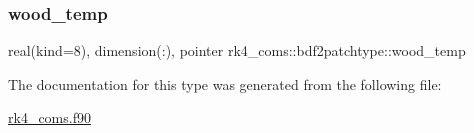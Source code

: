 \mbox{\label{structrk4__coms_1_1bdf2patchtype_a760e813763073c0ebbcc9768d2d85b92}} 
\subsubsection{\texorpdfstring{wood\+\_\+temp}{wood\_temp}}
{\footnotesize\ttfamily real(kind=8), dimension(\+:), pointer rk4\+\_\+coms\+::bdf2patchtype\+::wood\+\_\+temp}



The documentation for this type was generated from the following file\+:\begin{DoxyCompactItemize}
\item 
\hyperlink{rk4__coms_8f90}{rk4\+\_\+coms.\+f90}\end{DoxyCompactItemize}
